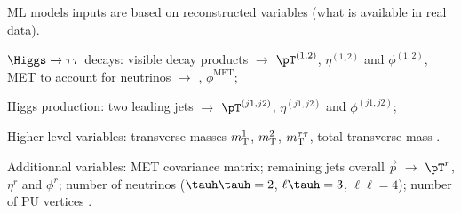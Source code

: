 \begin{frame}%

\manip ML models inputs are based on reconstructed variables (what is available in real data).

\pause
\manip $\Higgs\to\tau\tau$ decays:
\submanip visible decay products $\to$ $\pT^{(1,2)}$, $\eta^{(1,2)}$ and $\phi^{(1,2)}$,
\submanip MET to account for neutrinos $\to$ \MET, $\phi^\text{MET}$;

\pause
\manip Higgs production:
\submanip two leading jets $\to$ $\pT^{(j1,j2)}$, $\eta^{(j1,j2)}$ and $\phi^{(j1,j2)}$;

\pause
\manip Higher level variables:
\submanip transverse masses $m_{\mathrm{T}}^1$, $m_{\mathrm{T}}^2$, $m_{\mathrm{T}}^{\tau\tau}$,
\submanip total transverse mass \mTtot.

\pause
\manip Additionnal variables:
\submanip MET covariance matrix;
\submanip remaining jets overall $\vec{p}$ $\to$ $\pT^r$, $\eta^r$ and $\phi^r$;
\submanip number of neutrinos ($\tauh\tauh = 2$, $\ell\tauh=3$, $\ell\ell=4$);
\submanip number of PU vertices .

%

\end{frame}
